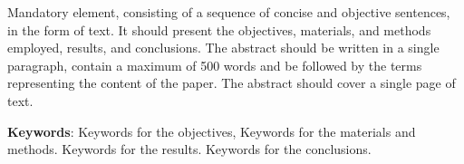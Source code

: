 Mandatory element, consisting of a sequence of concise and objective sentences, in the form of text.
It should present the objectives, materials, and methods employed, results, and conclusions. The abstract should be written in a single paragraph, contain a maximum of 500 words and be followed by the terms representing the content of the paper. The abstract should cover a single page of text.
\vfill

\noindent \textbf {Keywords}: Keywords  for the objectives, Keywords  for the materials and methods. Keywords for the results. Keywords for the conclusions.